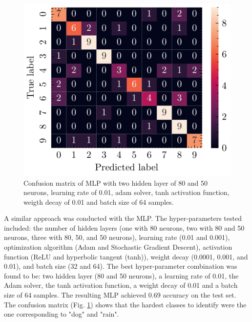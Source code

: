 \documentclass[journal]{IEEEtran}
\begin{document}
\begin{figure}[ht]
    \centering
    \includegraphics[width=\linewidth]{confusion_matrix_mlp.pdf}
    \caption{Confusion matrix of MLP with two hidden layer of 80 and 50 neurons, learning rate of 0.01, adam solver, tanh activation function, weigth decay of 0.01 and batch size of 64 samples.}
    \label{fig:mlp_confusion_matrix}
\end{figure}

A similar approach was conducted with the MLP. The hyper-parameters tested included: the number of hidden layers (one with 80 neurons, two with 80 and 50 neurons, three with 80, 50, and 50 neurons), learning rate (0.01 and 0.001), optimization algorithm (Adam and Stochastic Gradient Descent), activation function (ReLU and hyperbolic tangent (tanh)), weight decay (0.0001, 0.001, and 0.01), and batch size (32 and 64). The best hyper-parameter combination was found to be: two hidden layer (80 and 50 neurons), a learning rate of 0.01, the Adam solver, the tanh activation function, a weight decay of 0.01 and a batch size of 64 samples.
The resulting MLP achieved 0.69 accuracy on the test set. The confusion matrix (Fig. \ref{fig:mlp_confusion_matrix}) shows that the hardest classes to identify were the one corresponding to "dog" and "rain".
\end{document}
